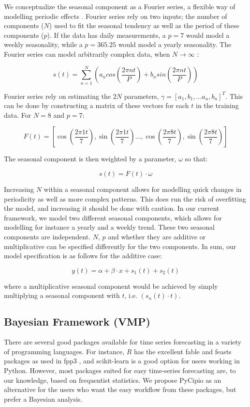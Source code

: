 \documentclass{article}
\begin{document}
\noindent We conceptualize the seasonal component as a Fourier series, a flexible way of modelling periodic effects \cite{taylor2018forecasting}. Fourier series rely on two inputs; the number of components ($N$) used to fit the seasonal tendency as well as the period of these components ($p$). If the data has daily measurements, a $p = 7$ would model a weekly seasonality, while a $p = 365.25$ would model a yearly seasonality. The Fourier series can model arbitrarily complex data, when $N \to \infty $ \cite{taylor2018forecasting}:

$$s(t) = \sum _{n=1} ^N \left( a_n cos(\frac{2 \pi n t}{P}) + b_n sin(\frac{2 \pi n t}{P}) \right)$$

\noindent Fourier series rely on estimating the $2N$ parameters, $\gamma = [a_1, b_1, … a_n, b_n]^T$. This can be done by constructing a matrix of these vectors for each $t$ in the training data. For $N = 8$ and $p = 7$:

$$F(t) = \left[ \cos(\frac{2 \pi 1 t}{7}), \sin(\frac{2 \pi 1 t}{7}) \dots, \cos(\frac{2 \pi 8 t}{7}), \sin(\frac{2 \pi 8 t}{7}) \right]$$

\noindent The seasonal component is then weighted by a parameter, $\omega$ so that:

$$s(t) = F(t) \cdot \omega$$

\noindent Increasing $N$ within a seasonal component allows for modelling quick changes in periodicity as well as more complex patterns. This does run the risk of overfitting the model, and increasing it should be done with caution. In our current framework, we model two different seasonal components, which allows for modelling for instance a yearly and a weekly trend. These two seasonal components are independent. $N$, $p$ and whether they are additive or multiplicative can be specified differently for the two components. In sum, our model specification is as follows for the additive case:

$$y(t) = \alpha + \beta \cdot x + s_1(t) + s_2(t)$$

\noindent where a multiplicative seasonal component would be achieved by simply multiplying a seasonal component with $t$, i.e. $(s_n(t) \cdot t)$.


\subsection{Bayesian Framework (VMP)}

\noindent There are several good packages available for time series forecasting in a variety of programming languages. For instance, $R$ has the excellent fable and feasts packages \cite{fable_package, feasts_package} as used in fpp3 \cite{fpp3}, and scikit-learn \cite{scikit-learn} is a good option for users working in Python. However, most packages suited for easy time-series forecasting are, to our knowledge, based on frequentist statistics. We propose PyCipio as an alternative for the users who want the easy workflow from these packages, but prefer a Bayesian analysis.   
\end{document}
